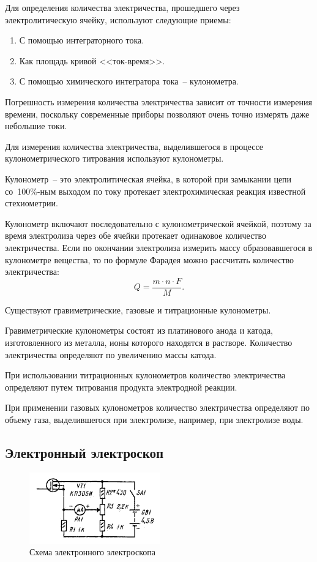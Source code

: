 \documentclass[pscyr]{hedwork}
\begin{document}
  Для определения количества электричества, прошедшего через электролитическую
  ячейку, используют следующие приемы:
  \begin{enumerate}
    \item С помощью интеграторного тока.
    \item Как площадь кривой <<ток-время>>.
    \item С помощью химического интегратора тока~-- кулонометра.
  \end{enumerate}

  Погрешность измерения количества электричества зависит от точности измерения
  времени, поскольку современные приборы позволяют очень точно измерять даже
  небольшие токи.

  Для измерения количества электричества, выделившегося в процессе
  кулонометрического титрования используют кулонометры.

  Кулонометр~-- это электролитическая ячейка, в которой при замыкании цепи
  со~100\%-ным выходом по току протекает электрохимическая реакция известной
  стехиометрии.

  Кулонометр включают последовательно с кулонометрической ячейкой, поэтому за
  время электролиза через обе ячейки протекает одинаковое количество
  электричества. Если по окончании электролиза измерить массу образовавшегося в
  кулонометре вещества, то по формуле Фарадея можно рассчитать количество
  электричества:
  \[
    Q = \frac{m\cdot n\cdot F}{M}.
  \]

  Существуют гравиметрические, газовые и титрационные кулонометры.

  Гравиметрические кулонометры состоят из платинового анода и катода,
  изготовленного из металла, ионы которого находятся в растворе. Количество
  электричества определяют по увеличению массы катода.

  При использовании титрационных кулонометров количество электричества
  определяют путем титрования продукта электродной реакции.

  При применении газовых кулонометров количество электричества определяют по
  объему газа, выделившегося при электролизе, например, при электролизе воды.

  \subsection{Электронный электроскоп}

  \begin{figure}[ht]
    \center
    \includegraphics{sl_5_1}
    \caption{Схема электронного электроскопа}
    \label{picElElec}
  \end{figure}
\end{document}
